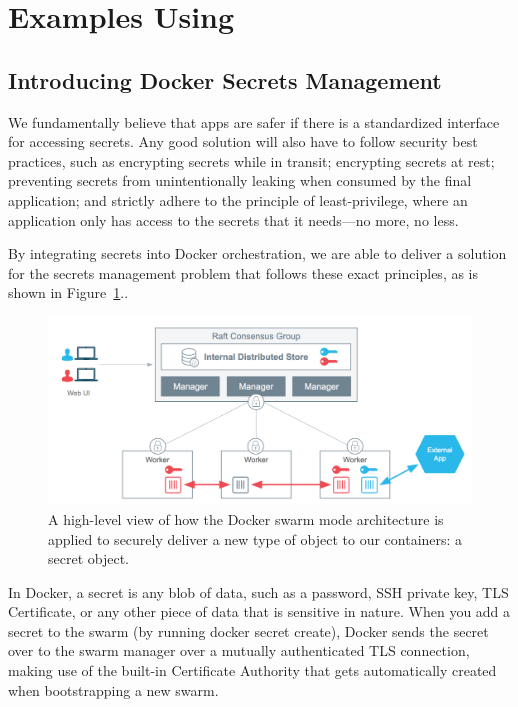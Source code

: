 \section{Examples Using \sysname}
\label{SEC:examples}





\subsection{Introducing Docker Secrets Management}


We fundamentally believe that apps are safer if there is a standardized
interface for accessing secrets. Any good solution will also have to follow
security best practices, such as encrypting secrets while in transit;
encrypting secrets at rest; preventing secrets from unintentionally leaking
when consumed by the final application; and strictly adhere to the
principle of least-privilege, where an application only has access to the
secrets that it needs—no more, no less.

By integrating secrets into Docker orchestration, we are able to deliver a
solution for the secrets management problem that follows these exact
principles, as is shown in Figure~\ref{fig-swarm-arch}..

\begin{figure}[t]
  \center{}
  \includegraphics[width=.5\textwidth]{images/swarm_architecture.png}
  \caption{A high-level view of how the Docker swarm
mode architecture is applied to securely deliver a new type of object to
our containers: a secret object.
  \label{fig-swarm-arch} }
\end{figure}




In Docker, a secret is any blob of data, such as a password, SSH private
key, TLS Certificate, or any other piece of data that is sensitive in
nature. When you add a secret to the swarm (by running docker secret
create), Docker sends the secret over to the swarm manager over a mutually
authenticated TLS connection, making use of the built-in Certificate
Authority that gets automatically created when bootstrapping a new swarm.

